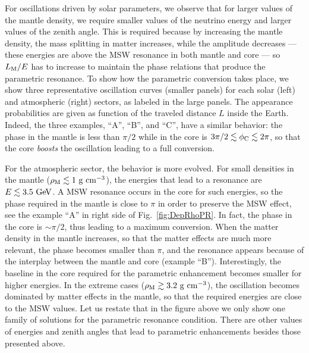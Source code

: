 For oscillations driven by solar parameters, we observe that for larger values of the mantle density, we require smaller values of the neutrino energy and larger values of the zenith angle. 
This is required because by increasing the mantle density, the mass splitting in matter increases, while the amplitude decreases --- these energies are above the MSW resonance in both mantle and core --- so  $L_{\rm M}/E$ has to increase to maintain the phase relations that produce the parametric resonance.
To show how the parametric conversion takes place, we show three representative oscillation curves (smaller panels) for each solar (left) and atmospheric (right) sectors, as labeled in the large panels.
The appearance probabilities are given as function of the traveled distance $L$ inside the Earth.
Indeed, the three examples, ``A'', ``B'', and ``C'', have a similar behavior: the phase in the mantle is less than $\pi/2$ while in the core is $3\pi/2\lesssim \phi_{\rm C}\lesssim 2\pi$, so that the core \emph{boosts} the oscillation leading to a full conversion.

For the atmospheric sector, the behavior is more evolved. 
For small densities in the mantle ($\rho_{\rm M}\lesssim 1~{\rm g\ cm^{-3}}$), the energies that lead to a resonance are $E\lesssim 3.5~{\rm GeV}$. 
A MSW resonance occurs in the core  for such energies, so the phase required in the mantle is close to $\pi$ in order to preserve the MSW effect, see the  example ``A'' in right side of Fig.~\ref{fig:DepRhoPR}. 
In fact, the phase in the core is $\sim \pi/2$, thus leading to a maximum conversion.
When the matter density in the mantle increases, so that the matter effects are much more relevant, the phase becomes smaller than $\pi$, and the resonance appears because of the interplay between the mantle and core (example ``B'').
Interestingly, the baseline in the core required for the parametric enhancement becomes smaller for higher energies. 
In the extreme cases ($\rho_{\rm M}\gtrsim 3.2~{\rm g\ cm^{-3}}$), the oscillation becomes dominated by matter effects in the mantle, so that the required energies are close to the MSW values.
Let us restate that in the figure above we only show one family of solutions for the parametric resonance condition. 
There are other values of energies and zenith angles that lead to  parametric enhancements besides those presented above.

